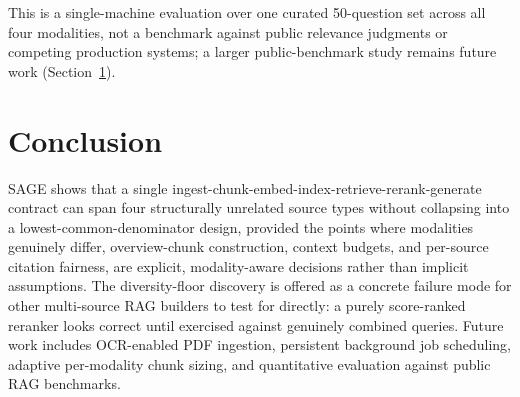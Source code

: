 \documentclass[conference]{IEEEtran}
\begin{document}
This is a single-machine evaluation over one curated 50-question set across all four modalities, not a benchmark against public relevance judgments or competing production systems; a larger public-benchmark study remains future work (Section~\ref{sec:conclusion}).

\section{Conclusion}
\label{sec:conclusion}

SAGE shows that a single ingest-chunk-embed-index-retrieve-rerank-generate contract can span four structurally unrelated source types without collapsing into a lowest-common-denominator design, provided the points where modalities genuinely differ, overview-chunk construction, context budgets, and per-source citation fairness, are explicit, modality-aware decisions rather than implicit assumptions. The diversity-floor discovery is offered as a concrete failure mode for other multi-source RAG builders to test for directly: a purely score-ranked reranker looks correct until exercised against genuinely combined queries. Future work includes OCR-enabled PDF ingestion, persistent background job scheduling, adaptive per-modality chunk sizing, and quantitative evaluation against public RAG benchmarks.
\end{document}
